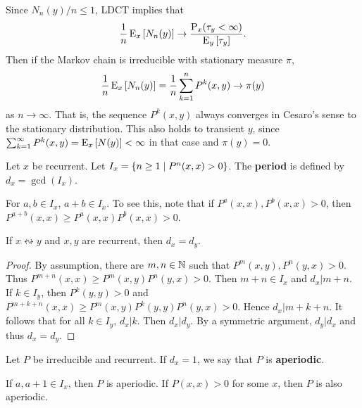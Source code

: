 \begin{remark}
    Since $N_n(y)/n\leq 1$, LDCT implies that 
    \begin{equation*}
        \frac{1}{n}\operatorname{E}_x\left[ {N_n(y)} \right]\to \frac{\operatorname{P}_x(\tau_y<\infty)}{\operatorname{E}_y\left[ {\tau_y} \right]}.
    \end{equation*}
    Then if the Markov chain is irreducible with stationary measure $\pi$, 
    \begin{equation*}
        \frac{1}{n}\operatorname{E}_x\left[ {N_n(y)} \right] = \frac{1}{n}\sum_{k=1}^n P^k(x,y)\to \pi(y)
    \end{equation*}
    as $n\to\infty$. That is, the sequence $P^k(x,y)$ always converges 
    in Cesaro's sense to the stationary distribution. This also holds 
    to transient $y$, since $\sum_{k=1}^\infty P^k(x,y) = \operatorname{E}_x\left[ {N(y)} \right]<\infty$ 
    in that case and $\pi(y) = 0$. 
\end{remark}

\begin{definition}
    Let $x$ be recurrent. Let $I_x = \left\{ n\geq 1 \;\middle\vert\; P^n(x,x)>0 \right\}$. The 
    \textbf{period} is defined by $d_x = \gcd(I_x)$. 
\end{definition}
\begin{remark}
    For $a,b\in I_x$, $a+b\in I_x$. To see this, note that if 
    $P^a(x,x), P^b(x,x)>0$, then $P^{a+b}(x,x)\geq P^a(x,x)P^b(x,x)>0$. 
\end{remark}

\begin{lemma}
    If $x\leftrightsquigarrow y$ and $x,y$ are recurrent, then $d_x = d_y$.
\end{lemma}
\begin{proof}
    By assumption, there are $m,n\in\mathbb{N}$ such that $P^m(x,y),P^n(y,x)>0$. Thus 
    $P^{m+n}(x,x)\geq P^m(x,y)P^n(y,x)>0$. Then $m+n\in I_x$ and $d_x|m+n$. 
    If $k\in I_y$, then $P^k(y,y)>0$ and $P^{m+k+n}(x,x)\geq P^m(x,y)P^k(y,y)P^n(y,x)>0$. 
    Hence $d_x|m+k+n$. It follows that for all $k\in I_y$, $d_x|k$. Then 
    $d_x|d_y$. By a symmetric argument, $d_y|d_x$ and thus $d_x = d_y$. 
\end{proof}

\begin{definition}
    Let $P$ be irreducible and recurrent. If $d_x = 1$, we say that $P$ 
    is \textbf{aperiodic}. 
\end{definition}
\begin{remark}
    If $a,a+1\in I_x$, then $P$ is aperiodic. If $P(x,x)>0$ for some 
    $x$, then $P$ is also aperiodic. 
\end{remark}


